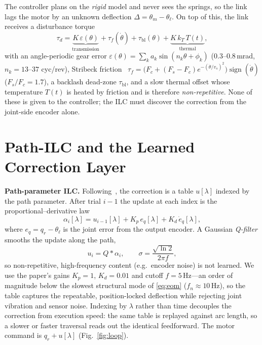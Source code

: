 \documentclass[10pt,twocolumn]{article}
\begin{document}
The controller plans on the \emph{rigid} model and never sees the springs, so the
link lags the motor by an unknown deflection $\Delta=\theta_m-\theta_\ell$. On top
of this, the link receives a disturbance torque
\begin{equation}
\tau_d = \underbrace{K\,\varepsilon(\theta)}_{\text{transmission}}
       + \tau_{f}(\dot\theta) + \tau_{\text{bl}}(\theta)
       + \underbrace{K\,k_T\,T(t)}_{\text{thermal}},
\label{eq:dist}
\end{equation}
with an angle-periodic gear error
$\varepsilon(\theta)=\sum_k a_k\sin(n_k\theta+\phi_k)$ ($0.3$--$0.8$\,mrad,
$n_k=13$--$37$ cyc/rev), Stribeck friction~\cite{armstrong1994}
$\tau_f=\big(F_c+(F_s{-}F_c)e^{-(\dot\theta/v_s)^2}\big)\operatorname{sign}(\dot\theta)$
($F_s/F_c=1.7$), a backlash dead-zone $\tau_{\text{bl}}$, and a slow thermal
offset whose temperature $T(t)$ is heated by friction and is therefore
\emph{non-repetitive}. None of these is given to the controller; the ILC must
discover the correction from the joint-side encoder alone.

\section{Path-ILC and the Learned Correction Layer}\label{sec:method}
\textbf{Path-parameter ILC.} Following~\cite{schwegel2024}, the correction is a
table $u[\lambda]$ indexed by the path parameter. After trial $i{-}1$ the update
at each index is the proportional--derivative law
\begin{equation}
\alpha_i[\lambda] = u_{i-1}[\lambda] + K_p\,e_q[\lambda] + K_d\,\dot e_q[\lambda],
\label{eq:pd}
\end{equation}
where $e_q=q_r-\theta_\ell$ is the joint error from the output encoder. A Gaussian
\emph{Q-filter} smooths the update along the path,
\begin{equation}
u_i = Q * \alpha_i,\qquad \sigma=\frac{\sqrt{\ln 2}}{2\pi f},
\label{eq:q}
\end{equation}
so non-repetitive, high-frequency content (e.g.\ encoder noise) is not learned. We
use the paper's gains $K_p{=}1$, $K_d{=}0.01$ and cutoff $f{=}5$\,Hz---an order of
magnitude below the slowest structural mode of \eqref{eq:eom} ($f_n\!\approx\!10$\,Hz),
so the table captures the repeatable, position-locked deflection while rejecting
joint vibration and sensor noise. Indexing by $\lambda$ rather than time
decouples the correction from execution speed: the same table is replayed against
arc length, so a slower or faster traversal reads out the identical feedforward.
The motor command is $q_r+u[\lambda]$ (Fig.~\ref{fig:loop}).
\end{document}
